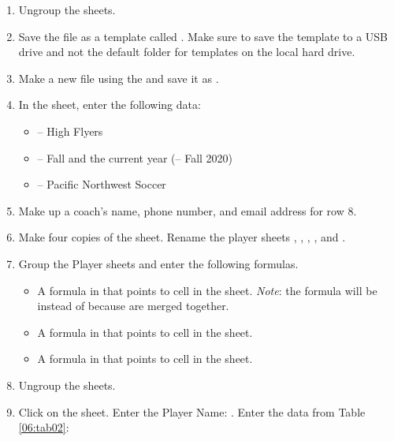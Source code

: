 \begin{enumerate}
	\item Ungroup the sheets.
	\item Save the file as a template called . Make sure to save the  template to a USB drive and not the default folder for templates on the local hard drive.
	\item Make a new file using the  and save it as .
	\item In the  sheet, enter the following data:
	
	\begin{itemize}
		\item {} – High Flyers
		\item {} – Fall and the current year (\ie – Fall 2020)
		\item {} – Pacific Northwest Soccer
	\end{itemize}
	
	\item Make up a coach's name, phone number, and email address for row $ 8 $.
	\item Make four copies of the  sheet. Rename the player sheets , , , , and .
	\item Group the Player sheets and enter the following formulas.

	\begin{itemize}
		\item A formula in  that points to cell  in the  sheet. \textit{Note}: the formula will be  instead of  because  are merged together.
		\item A formula in  that points to cell  in the  sheet.
		\item A formula in  that points to cell  in the  sheet.
	\end{itemize}	

	\item Ungroup the sheets.
	\item Click on the  sheet. Enter the Player Name: . Enter the data from Table \ref{06:tab02}:
\end{enumerate}

